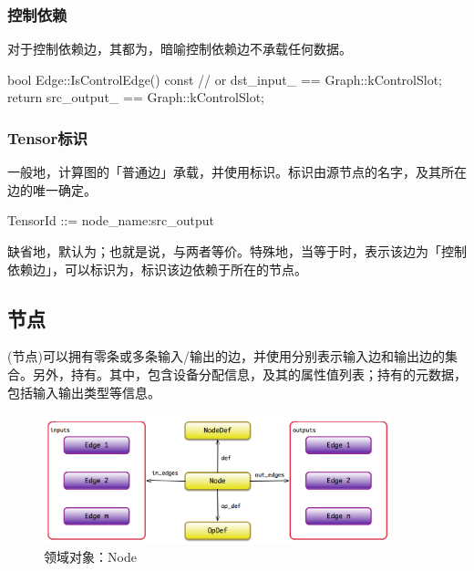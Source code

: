 \begin{content}
\subsubsection{控制依赖}

对于控制依赖边，其都为，暗喻控制依赖边不承载任何数据。

\begin{leftbar}
\begin{c++}
bool Edge::IsControlEdge() const {
   // or dst\_input\_ == Graph::kControlSlot;
   return src_output_ == Graph::kControlSlot;
}
\end{c++}
\end{leftbar}

\subsubsection{Tensor标识}

一般地，计算图的「普通边」承载，并使用标识。标识由源节点的名字，及其所在边的唯一确定。

\begin{leftbar}
\begin{c++}
TensorId ::= node_name:src_output
\end{c++}
\end{leftbar}

缺省地，默认为；也就是说，与两者等价。特殊地，当等于时，表示该边为「控制依赖边」，可以标识为，标识该边依赖于所在的节点。

\subsection{节点}

(节点)可以拥有零条或多条输入/输出的边，并使用分别表示输入边和输出边的集合。另外，持有。其中，包含设备分配信息，及其的属性值列表；持有的元数据，包括输入输出类型等信息。

\begin{figure}[H]
\centering
\includegraphics[width=0.9\textwidth]{figures/cc-node-model.png}
\caption{领域对象：Node}
 \label{fig:cc-node-model}
\end{figure}


\end{content}
